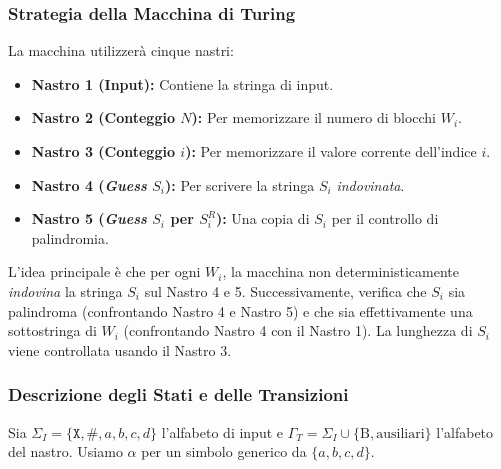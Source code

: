 \documentclass[a4paper]{article}
\newcommand{\B}{\text{B}} %
\begin{document}
\subsubsection{Strategia della Macchina di Turing}
La macchina utilizzerà cinque nastri:
\begin{itemize}
    \item \textbf{Nastro 1 (Input):} Contiene la stringa di input.
    \item \textbf{Nastro 2 (Conteggio $N$):} Per memorizzare il numero di blocchi $W_i$.
    \item \textbf{Nastro 3 (Conteggio $i$):} Per memorizzare il valore corrente dell'indice $i$.
    \item \textbf{Nastro 4 (\textit{Guess} $S_i$):} Per scrivere la stringa $S_i$ \textit{indovinata}.
    \item \textbf{Nastro 5 (\textit{Guess} $S_i$ per $S_i^R$):} Una copia di $S_i$ per il controllo di palindromia.
\end{itemize}

L'idea principale è che per ogni $W_i$, la macchina non deterministicamente \textit{indovina} la stringa $S_i$ sul Nastro 4 e 5. Successivamente, verifica che $S_i$ sia palindroma (confrontando Nastro 4 e Nastro 5) e che sia effettivamente una sottostringa di $W_i$ (confrontando Nastro 4 con il Nastro 1). La lunghezza di $S_i$ viene controllata usando il Nastro 3.

\subsubsection{Descrizione degli Stati e delle Transizioni}
Sia $\Sigma_I = \{\texttt{X}, \texttt{\#}, a,b,c,d\}$ l'alfabeto di input e $\Gamma_T = \Sigma_I \cup \{\B, \text{ausiliari}\}$ l'alfabeto del nastro. Usiamo $\alpha$ per un simbolo generico da $\{a,b,c,d\}$.
\end{document}
